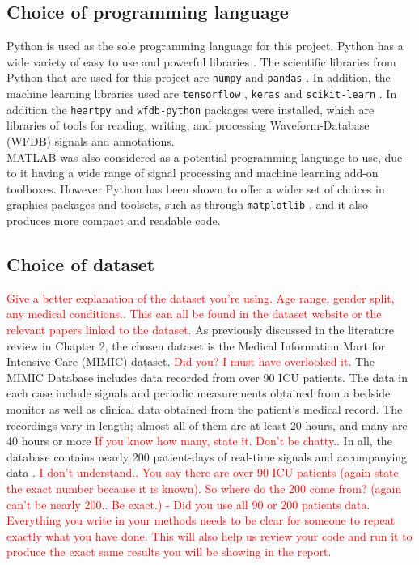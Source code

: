 \subsection{Choice of programming language}
Python is used as the sole programming language for this project. Python has a wide 
variety of easy to use and powerful libraries \cite{Python}. The scientific libraries from Python 
that are used for this project are \texttt{numpy} \cite{numpy} and \texttt{pandas} \cite{pandas}. In addition, the 
machine learning libraries used are \texttt{tensorflow} \cite{tensorflow}, \texttt{keras} \cite{keras} and \texttt{scikit-learn} \cite{scikit}. 
In addition the \texttt{heartpy} \cite{heartpy} and \texttt{wfdb-python} \cite{wfdb} packages were installed, which are libraries of 
tools for reading, writing, and processing Waveform-Database (WFDB) signals and annotations. \\ \newline \noindent MATLAB was also 
considered as a potential programming language to use, due to it having a wide range of 
signal processing and machine learning add-on toolboxes. However Python has been shown 
to offer a wider set of choices in graphics packages and toolsets, such as 
through \texttt{matplotlib} \cite{matplotlib}, and it also produces more compact and readable 
code.

\subsection{Choice of dataset}
\textcolor{red}{Give a better explanation of the dataset you're using. Age range, gender split, any medical conditions.. This can all be found in the dataset website or the relevant papers linked to the dataset.}
As previously discussed in the literature review in Chapter 2, the chosen dataset is the 
Medical Information Mart for Intensive Care (MIMIC) dataset. \textcolor{red}{Did you? I must have overlooked it.} The MIMIC Database 
includes data recorded from over 90 ICU patients. The data in each case include 
signals and periodic measurements obtained from a bedside monitor as well as clinical 
data obtained from the patient's medical record. The recordings vary in length; almost 
all of them are at least 20 hours, and many are 40 hours or more \textcolor{red}{If you know how many, state it. Don't be chatty.}. In all, the database 
contains nearly 200 patient-days of real-time signals and accompanying data \cite{Moody1996}.
\textcolor{red}{I don't understand.. You say there are over 90 ICU patients (again state the exact number because it is known). So where do the 200 come from? (again can't be nearly 200.. Be exact.) - Did you use all 90 or 200 patients data. Everything you write in your methods needs to be clear for someone to repeat exactly what you have done. This will also help us review your code and run it to produce the exact same results you will be showing in the report.}

